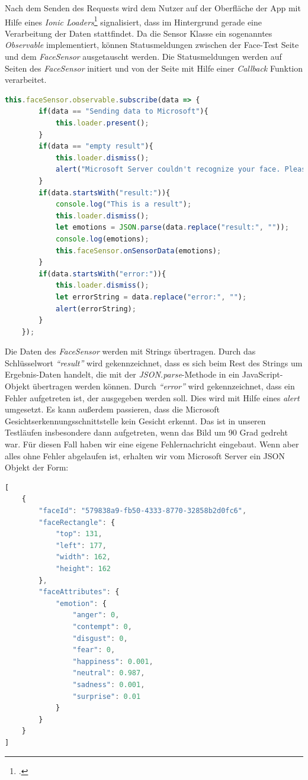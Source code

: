Nach dem Senden des Requests wird  dem Nutzer auf der Oberfläche der App mit Hilfe eines \textit{Ionic Loaders}\footcite{Ion18f} signalisiert, dass im Hintergrund gerade eine Verarbeitung der Daten stattfindet. Da die Sensor Klasse ein sogenanntes \textit{Observable} implementiert, können Statusmeldungen zwischen der Face-Test Seite und dem \textit{FaceSensor} ausgetauscht werden. Die Statusmeldungen werden auf Seiten des \textit{FaceSensor} initiert und von der Seite mit Hilfe einer \textit{Callback} Funktion verarbeitet. \newline
\begin{lstlisting}[caption={Callback Methode auf FaceSensor Observable}, language=JavaScript]
	this.faceSensor.observable.subscribe(data => {
		if(data == "Sending data to Microsoft"){
			this.loader.present();
		}
		if(data == "empty result"){
			this.loader.dismiss();
			alert("Microsoft Server couldn't recognize your face. Please make sure your face is visible");
		}
		if(data.startsWith("result:")){
			console.log("This is a result");
			this.loader.dismiss();
			let emotions = JSON.parse(data.replace("result:", ""));
			console.log(emotions);
			this.faceSensor.onSensorData(emotions);
		}
		if(data.startsWith("error:")){
			this.loader.dismiss();
			let errorString = data.replace("error:", "");
			alert(errorString);
		}
	});
\end{lstlisting}
Die Daten des \textit{FaceSensor} werden mit Strings übertragen. Durch das Schlüsselwort \textit{``result''} wird gekennzeichnet, dass es sich beim Rest des Strings um Ergebnis-Daten handelt, die mit der \textit{JSON.parse}-Methode in ein JavaScript-Objekt übertragen werden können. Durch \textit{``error''} wird gekennzeichnet, dass ein Fehler aufgetreten ist, der ausgegeben werden soll. Dies wird mit Hilfe eines \textit{alert} umgesetzt. Es kann außerdem passieren, dass die Microsoft Gesichtserkennungsschnittstelle kein Gesicht erkennt. Das ist in unseren Testläufen insbesondere dann aufgetreten, wenn das Bild um 90 Grad gedreht war. Für diesen Fall haben wir eine eigene Fehlernachricht eingebaut.\newline
Wenn aber alles ohne Fehler abgelaufen ist, erhalten wir vom Microsoft Server ein JSON Objekt der Form: \newpage
\begin{lstlisting}[caption={Ergebnis Gesichtserkennungsschnittstelle, Beispiel Microsoft}, language=JavaScript]
[
	{
		"faceId": "579838a9-fb50-4333-8770-32858b2d0fc6",
		"faceRectangle": {
			"top": 131,
			"left": 177,
			"width": 162,
			"height": 162
		},
		"faceAttributes": {
			"emotion": {
				"anger": 0,
				"contempt": 0,
				"disgust": 0,
				"fear": 0,
				"happiness": 0.001,
				"neutral": 0.987,
				"sadness": 0.001,
				"surprise": 0.01
			}
		}
	}
]
\end{lstlisting}
